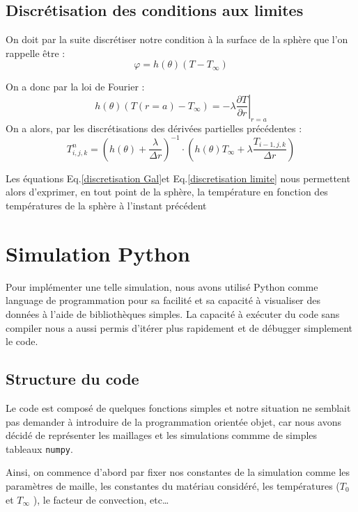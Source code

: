 \documentclass[fleqn]{article}
\renewcommand{\phi}{\varphi}
\begin{document}
\subsection{Discrétisation des conditions aux limites}

On doit par la suite discrétiser notre condition à la surface de la sphère que l'on rappelle être :
\begin{equation}
    \phi = h(\theta)(T - T_{\infty})
\end{equation}

On a donc par la loi de Fourier :
\begin{equation}
    h(\theta)(T(r = a) - T_\infty) = -\lambda \left.\frac{ \partial T}{\partial r}\right|_{r=a} 
\end{equation}
On a alors, par les discrétisations des dérivées partielles précédentes :
\begin{equation}
    T_{i,j,k}^n = \left(h(\theta) + \frac{\lambda}{\Delta r}\right)^{-1} \cdot \left( h(\theta) T_\infty + \lambda \frac{T_{i-1,j,k}}{\Delta r}\right)
    \label{discretisation limite}
\end{equation}

Les équations Eq.\eqref{discretisation Gal}et Eq.\eqref{discretisation limite} nous permettent alors d'exprimer, en tout point de la sphère, la température en fonction des températures de la sphère à l'instant précédent





\section{Simulation Python} 
Pour implémenter une telle simulation, nous avons utilisé Python comme language de programmation pour sa facilité et sa capacité à visualiser des données à l'aide de bibliothèques simples. La capacité à exécuter du code sans compiler nous a aussi permis d'itérer plus rapidement et de débugger simplement le code.
\subsection{Structure du code}
Le code est composé de quelques fonctions simples et notre situation ne semblait pas demander à introduire de la programmation orientée objet, car nous avons décidé de représenter les maillages et les simulations commme de simples tableaux \texttt{numpy}. 

Ainsi, on commence d'abord par fixer nos constantes de la simulation comme les paramètres de maille, les constantes du matériau considéré, les températures ($T_0$ et $T_\infty$ ), le facteur de convection, etc\dots
\end{document}

